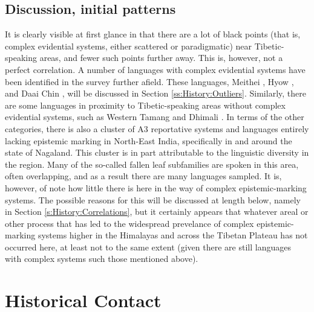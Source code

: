 \subsection{Discussion, initial patterns}\label{ss:History:MapPatterns}
It is clearly visible at first glance in  that there are a lot of black points (that is, complex evidential systems, either scattered or paradigmatic) near Tibetic-speaking areas, and fewer such points further away. This is, however, not a perfect correlation. A number of languages with complex evidential systems have been identified in the survey further afield. These languages, Meithei \cite{Chelliah1997}, Hyow \cite{Zakaria2018}, and Daai Chin \cite{SoHartmann2009}, will be discussed in Section \ref{ss:History:Outliers}. Similarly, there are some languages in proximity to Tibetic-speaking areas without complex evidential systems, such as Western Tamang \cite{Regmi2018} and Dhimali \cite{King2009}. In terms of the other categories, there is also a cluster of A3 reportative systems and languages entirely lacking epistemic marking in North-East India, specifically in and around the state of Nagaland. This cluster is in part attributable to the linguistic diversity in the region. Many of the so-called fallen leaf subfamilies \cite{VanDriem2014} are spoken in this area, often overlapping, and as a result there are many languages sampled. It is, however, of note how little there is here in the way of complex epistemic-marking systems. The possible reasons for this will be discussed at length below, namely in Section \ref{s:History:Correlations}, but it certainly appears that whatever areal or other process that has led to the widespread prevelance of complex epistemic-marking systems higher in the Himalayas and across the Tibetan Plateau has not occurred here, at least not to the same extent (given there are still languages with complex systems such those mentioned above).

\section{Historical Contact}\label{s:History:Contact}

